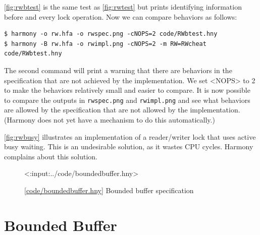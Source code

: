 \documentclass{report}
\newcommand{\harmonylink}[1]{%
[\href{https://harmony.cs.cornell.edu/#1}{\underline{#1}}]%
}
\newenvironment{code}{
\tcolorbox
}{
\endtcolorbox
}
\begin{document}
\autoref{fig:rwbtest} is the same test as \autoref{fig:rwtest} but
prints identifying information before and every lock operation.
Now we can compare behaviors as follows:

\begin{code}
\begin{verbatim}
$ harmony -o rw.hfa -o rwspec.png -cNOPS=2 code/RWbtest.hny
$ harmony -B rw.hfa -o rwimpl.png -cNOPS=2 -m RW=RWcheat code/RWbtest.hny
\end{verbatim}
\end{code}

The second command will print a warning that there are behaviors in the
specification that are not achieved by the implementation.
We set <{NOPS}> to 2 to make the behaviors relatively small and easier
to compare.
It is now possible to compare the outputs in \texttt{rwspec.png}
and \texttt{rwimpl.png} and see what behaviors are allowed by the
specification that are not allowed by the implementation.
(Harmony does not yet have a mechanism to do this automatically.)

\autoref{fig:rwbusy} illustrates an implementation of a reader/writer lock
that uses active busy waiting.  This is an undesirable solution, as it wastes
CPU cycles.  Harmony complains about this solution.

\begin{figure}
\begin{code}
<{:input:../code/boundedbuffer.hny}>
\end{code}
\caption{\harmonylink{code/boundedbuffer.hny} Bounded buffer specification}
\label{fig:boundedbuffer}
\end{figure}

\section{Bounded Buffer}
%
%
%
\end{document}
